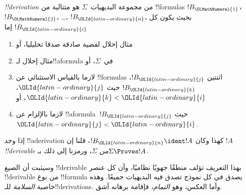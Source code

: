 \documentclass[../../../include/open-logic-section]{subfiles}
\begin{document}
\begin{defn}
\emph{!!{derivation}} من مجموعة البديهيات~$\Sigma$ هو متتالية من
!!{formula}s $!B_{\OLMathNumeral{1}}$، $!B_{\OLMathNumeral{2}}$، \dots، $!B_{\OLId{latin-ordinary}{n}}$، بحيث يكون كل $!B_{\OLId{latin-ordinary}{i}}$ إما
\begin{enumerate}
\item مثال إحلال لقضية صادقة صدقا تحليليا، أو
\item مثال إحلال لـ!!a{formula} في~$\Sigma$، أو
\item لازما بالقياس الاستثنائي عن !!{formula}s اثنتين $!B_{\OLId{latin-ordinary}{j}}$، $!B_{\OLId{latin-ordinary}{k}}$
  حيث ${\OLId{latin-ordinary}{j}}$، ${\OLId{latin-ordinary}{k}} < {\OLId{latin-ordinary}{i}}$، أو
\item لازما بالإلزام عن !!a{formula}~$!B_{\OLId{latin-ordinary}{j}}$ حيث ${\OLId{latin-ordinary}{j}} < {\OLId{latin-ordinary}{i}}$.
\end{enumerate}
إذا وجد !!a{derivation} كهذا وكان $!B_{\OLId{latin-ordinary}{n}} \ident !A$، قلنا إن
$!A$ \emph{!!{derivable} من $\Sigma$}، ورمزنا إلى ذلك بـ$\Sigma \Proves !A$.
\end{defn}

وسيثبت أن الصيغ !!{derivable} بهذا التعريف تؤلف منطقًا جهويًا
نظاميًا، وأن كل عنصر !!{derivable} من نوع !!{formula} يصدق
في كل نموذج تصدق فيه البديهيات جميعًا. وهذه خاصية
\emph{السلامة} للـ!!{derivation}s. وأما العكس، وهو
\emph{التمام}، فإقامة برهانه أشق.
\end{document}
